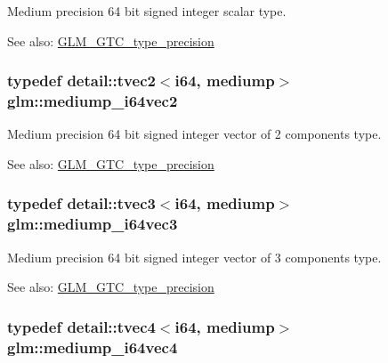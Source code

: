 Medium precision 64 bit signed integer scalar type. \begin{Desc}
\item[See also:]\hyperlink{group__gtc__type__precision}{GLM\_\-GTC\_\-type\_\-precision} \end{Desc}
\hypertarget{group__gtc__type__precision_g5cf0bec13b01b6124e966360cffe15a4}{
\subsubsection[mediump\_\-i64vec2]{\setlength{\rightskip}{0pt plus 5cm}typedef detail::tvec2$<$i64, mediump$>$ {\bf glm::mediump\_\-i64vec2}}}
\label{group__gtc__type__precision_g5cf0bec13b01b6124e966360cffe15a4}


Medium precision 64 bit signed integer vector of 2 components type. \begin{Desc}
\item[See also:]\hyperlink{group__gtc__type__precision}{GLM\_\-GTC\_\-type\_\-precision} \end{Desc}
\hypertarget{group__gtc__type__precision_ge1aa82d2b9a62a87648306205dfe69ab}{
\subsubsection[mediump\_\-i64vec3]{\setlength{\rightskip}{0pt plus 5cm}typedef detail::tvec3$<$i64, mediump$>$ {\bf glm::mediump\_\-i64vec3}}}
\label{group__gtc__type__precision_ge1aa82d2b9a62a87648306205dfe69ab}


Medium precision 64 bit signed integer vector of 3 components type. \begin{Desc}
\item[See also:]\hyperlink{group__gtc__type__precision}{GLM\_\-GTC\_\-type\_\-precision} \end{Desc}
\hypertarget{group__gtc__type__precision_gb4db11ebb425fa18fe5d15d455c360a3}{
\subsubsection[mediump\_\-i64vec4]{\setlength{\rightskip}{0pt plus 5cm}typedef detail::tvec4$<$i64, mediump$>$ {\bf glm::mediump\_\-i64vec4}}}
\label{group__gtc__type__precision_gb4db11ebb425fa18fe5d15d455c360a3}



